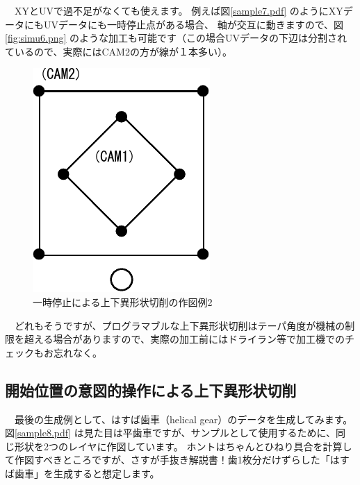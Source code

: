 
　XYとUVで過不足がなくても使えます。
例えば図\ref{sample7.pdf} のようにXYデータにもUVデータにも一時停止点がある場合、
軸が交互に動きますので、図\ref{fig:simu6.png} のような加工も可能です（この場合UVデータの下辺は分割されているので、実際にはCAM2の方が線が１本多い）。


\begin{figure}[H]
\centering
\includegraphics{No2/fig/sample7-crop.pdf}
\caption{一時停止による上下異形状切削の作図例2}
\label{fig:sample7.pdf}
\end{figure}


　どれもそうですが、プログラマブルな上下異形状切削はテーパ角度が機械の制限を超える場合がありますので、実際の加工前にはドライラン等で加工機でのチェックもお忘れなく。

\subsection{開始位置の意図的操作による上下異形状切削}
　最後の生成例として、はすば歯車（helical gear）のデータを生成してみます。
図\ref{sample8.pdf} は見た目は平歯車ですが、サンプルとして使用するために、同じ形状を2つのレイヤに作図しています。
ホントはちゃんとひねり具合を計算して作図すべきところですが、さすが手抜き解説書！歯1枚分だけずらした「はすば歯車」を生成すると想定します。

